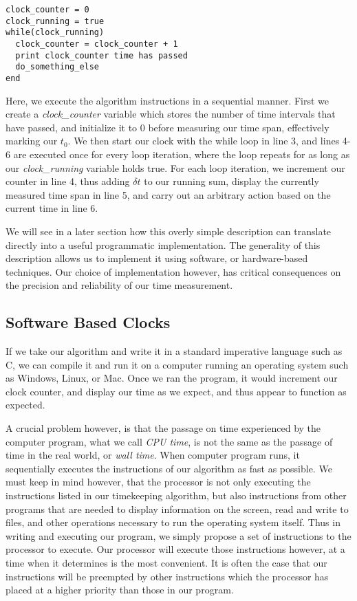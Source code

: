 \begin{lstlisting}[float=!h,caption=Digital Clock Algorithm, label=lis:clock,xleftmargin=80pt]
clock_counter = 0
clock_running = true
while(clock_running) 
  clock_counter = clock_counter + 1
  print clock_counter time has passed
  do_something_else
end
\end{lstlisting}


Here, we execute the algorithm instructions in a sequential manner.  First we create a \emph{clock\_counter} variable which stores the number of time intervals that have passed, and initialize it to 0 before measuring our time span, effectively marking our $t_0$.  We then start our clock with the while loop in line 3, and lines 4-6 are executed once for every loop iteration, where the loop repeats for as long as our \emph{clock\_running} variable holds true.  For each loop iteration, we increment our counter in line 4, thus adding $\delta t$ to our running sum, display the currently measured time span in line 5, and carry out an arbitrary action based on the current time in line 6.  

We will see in a later section how this overly simple description can translate directly into a useful programmatic implementation.  The generality of this description allows us to implement it using software, or hardware-based techniques.  Our choice of implementation however, has critical consequences on the precision and reliability of our time measurement.

\subsection{Software Based Clocks} 

If we take our algorithm and write it in a standard imperative language such
as C, we can compile it and run it on a computer running an operating system
such as Windows, Linux, or Mac.  Once we ran the program, it would increment
our clock counter, and display our time as we expect, and thus appear to function as expected.  

A crucial problem however, is that the passage on time experienced by the
computer program, what we call \emph{CPU time}, is not the same as the passage
of time in the real world, or \emph{wall time}.  When computer program runs,
it sequentially executes the instructions of our algorithm as fast as
possible.  We must keep in mind however, that the processor is not only
executing the instructions listed in our timekeeping algorithm, but also
instructions from other programs that are needed to display information on the
screen, read and write to files, and other operations necessary to run the
operating system itself.  Thus in writing and executing our program, we simply
propose a set of instructions to the processor to execute.  Our processor will
execute those instructions however, at a time when it determines is the most
convenient.  It is often the case that our instructions will be preempted by other instructions which the processor has placed at a higher priority than those in our program.

